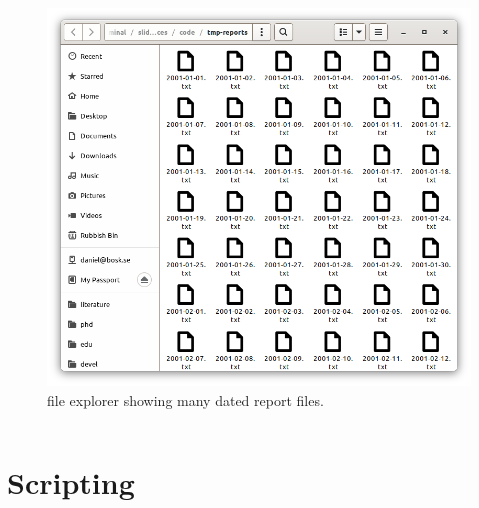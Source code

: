 \begin{frame}[fragile]
  \begin{figure}
    \includegraphics[height=0.5\textheight]{fig/many-reports.png}
    \caption{file explorer showing many dated report files.}
  \end{figure}

  \begin{solution}
    \inputminted[firstline=3]{bash}{code/summer.sh}
  \end{solution}
\end{frame}


\section{Scripting}

